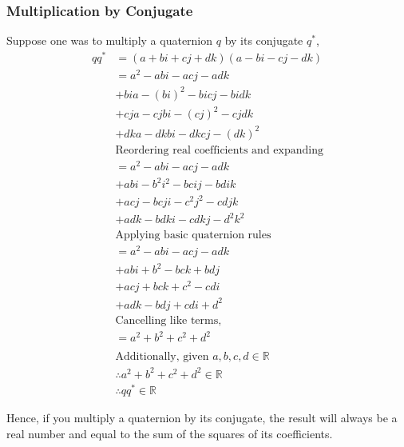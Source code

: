 \documentclass[12pt, a4paper]{article}
\begin{document}
\subsubsection{Multiplication by Conjugate}
Suppose one was to multiply a quaternion $q$ by its conjugate $q^*$,
\begin{align*}
    qq^* & = (a + bi + cj + dk)(a - bi - cj - dk)            \\
         & = a^2 - abi - acj - adk                           \\
         & + bia - (bi)^2 - bicj - bidk                      \\
         & + cja - cjbi - (cj)^2 - cjdk                      \\
         & + dka - dkbi - dkcj - (dk)^2                      \\
         & \text{Reordering real coefficients and expanding} \\
         & = a^2 - abi - acj - adk                           \\
         & + abi - b^2i^2 - bcij - bdik                      \\
         & + acj - bcji - c^2j^2 - cdjk                      \\
         & + adk - bdki - cdkj - d^2k^2                      \\
         & \text{Applying basic quaternion rules}            \\
         & = a^2 - abi - acj - adk                           \\
         & + abi + b^2 - bck + bdj                           \\
         & + acj + bck + c^2 - cdi                           \\
         & + adk - bdj + cdi + d^2                           \\
         &\text{Cancelling like terms,}                      \\
         & = a^2 + b^2 + c^2 + d^2                           \\
         \\
         & \text{Additionally, given } a, b, c, d \in \mathbb{R} \\
         & \therefore a^2 + b^2 + c^2 + d^2 \in \mathbb{R}       \\
         & \therefore qq^* \in \mathbb{R}
\end{align*}

Hence, if you multiply a quaternion by its conjugate, the result will always be
a real number and equal to the sum of the squares of its coefficients. \\
\end{document}
